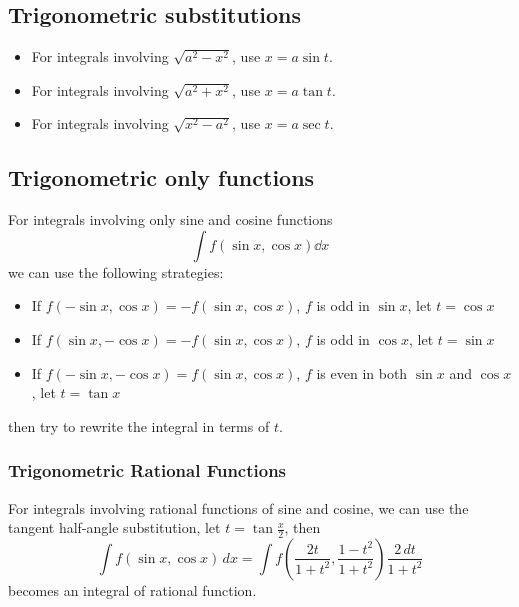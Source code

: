 \documentclass{overview}
\begin{document}
\subsection{Trigonometric substitutions}
\begin{itemize}
	\item For integrals involving $\sqrt{a^2 - x^2}$, use $x = a \sin t$.
	\item For integrals involving $\sqrt{a^2 + x^2}$, use $x = a \tan t$.
	\item For integrals involving $\sqrt{x^2 - a^2}$, use $x = a \sec t$. 
\end{itemize}


\subsection{Trigonometric only functions}

For integrals involving only sine and cosine functions
\[
	\int f(\sin x, \cos x) \dd x
\] 
we can use the following strategies:
\begin{itemize}
	\item If $f(-\sin x, \cos x) = -f(\sin x, \cos x)$,  $f$ is odd in $\sin x$, 
		let $t = \cos x$
	\item If $f(\sin x, -\cos x) = -f(\sin x, \cos x)$,  $f$ is odd in $\cos x$, 
		let $t = \sin x$
	\item If $f(-\sin x, -\cos x) = f(\sin x, \cos x)$,  $f$ is even in both $\sin x$ and $\cos x$, 
		let $t = \tan x$
\end{itemize}
then try to rewrite the integral in terms of $t$.


\subsubsection{Trigonometric Rational Functions}
For integrals involving rational functions of sine and cosine, we can use the
tangent half-angle substitution, let $t = \tan \frac{x}{2}$, then
\[
\int f (\sin x, \cos x)\, dx = \int f {\left ({\frac {2 t} {1 + 
          t^{2}}}, {\frac {1 - t^{2}} {1 + t^{2}}} \right)} {\frac {2\, dt} {1 + t^{2}}}
\]
becomes an integral of rational function.
\end{document}
